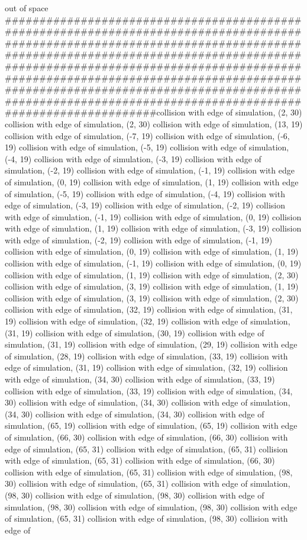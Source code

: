 out of space ##############################################################################################################################################################################################################################################################################################################################################################################collision with edge of simulation, (2, 30) collision with edge of simulation, (2, 30) collision with edge of simulation, (13, 19) collision with edge of simulation, (-7, 19) collision with edge of simulation, (-6, 19) collision with edge of simulation, (-5, 19) collision with edge of simulation, (-4, 19) collision with edge of simulation, (-3, 19) collision with edge of simulation, (-2, 19) collision with edge of simulation, (-1, 19) collision with edge of simulation, (0, 19) collision with edge of simulation, (1, 19) collision with edge of simulation, (-5, 19) collision with edge of simulation, (-4, 19) collision with edge of simulation, (-3, 19) collision with edge of simulation, (-2, 19) collision with edge of simulation, (-1, 19) collision with edge of simulation, (0, 19) collision with edge of simulation, (1, 19) collision with edge of simulation, (-3, 19) collision with edge of simulation, (-2, 19) collision with edge of simulation, (-1, 19) collision with edge of simulation, (0, 19) collision with edge of simulation, (1, 19) collision with edge of simulation, (-1, 19) collision with edge of simulation, (0, 19) collision with edge of simulation, (1, 19) collision with edge of simulation, (2, 30) collision with edge of simulation, (3, 19) collision with edge of simulation, (1, 19) collision with edge of simulation, (3, 19) collision with edge of simulation, (2, 30) collision with edge of simulation, (32, 19) collision with edge of simulation, (31, 19) collision with edge of simulation, (32, 19) collision with edge of simulation, (31, 19) collision with edge of simulation, (30, 19) collision with edge of simulation, (31, 19) collision with edge of simulation, (29, 19) collision with edge of simulation, (28, 19) collision with edge of simulation, (33, 19) collision with edge of simulation, (31, 19) collision with edge of simulation, (32, 19) collision with edge of simulation, (34, 30) collision with edge of simulation, (33, 19) collision with edge of simulation, (33, 19) collision with edge of simulation, (34, 30) collision with edge of simulation, (34, 30) collision with edge of simulation, (34, 30) collision with edge of simulation, (34, 30) collision with edge of simulation, (65, 19) collision with edge of simulation, (65, 19) collision with edge of simulation, (66, 30) collision with edge of simulation, (66, 30) collision with edge of simulation, (65, 31) collision with edge of simulation, (65, 31) collision with edge of simulation, (65, 31) collision with edge of simulation, (66, 30) collision with edge of simulation, (65, 31) collision with edge of simulation, (98, 30) collision with edge of simulation, (65, 31) collision with edge of simulation, (98, 30) collision with edge of simulation, (98, 30) collision with edge of simulation, (98, 30) collision with edge of simulation, (98, 30) collision with edge of simulation, (65, 31) collision with edge of simulation, (98, 30) collision with edge of 